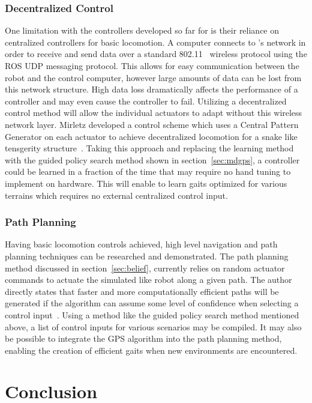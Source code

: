 \subsubsection{Decentralized Control}
One limitation with the controllers developed so far for \SB{} is their reliance on centralized controllers for basic locomotion.
A computer connects to \SB{}'s network in order to receive and send data over a standard 802.11~\cite{ieee1997wireless} wireless protocol using the ROS UDP messaging protocol.
This allows for easy communication between the robot and the control computer, however large amounts of data can be lost from this network structure.
High data loss dramatically affects the performance of a controller and may even cause the controller to fail.
Utilizing a decentralized control method will allow the individual actuators to adapt without this wireless network layer.
Mirletz \etal developed a control scheme which uses a Central Pattern Generator on each actuator to achieve decentralized locomotion for a snake like tensgerity structure~\cite{mirletz2015goal}.
Taking this approach and replacing the learning method with the guided policy search method shown in section~\ref{sec:mdgps}, a controller could be learned in a fraction of the time that may require no hand tuning to implement on hardware.
This will enable \SB{} to learn gaits optimized for various terrains which requires no external centralized control input.

\subsubsection{Path Planning}
Having basic locomotion controls achieved, high level navigation and path planning techniques can be researched and demonstrated.
The path planning method discussed in section~\ref{sec:belief}, currently relies on random actuator commands to actuate the simulated \SB{} like robot along a given path.
The author directly states that faster and more computationally efficient paths will be generated if the algorithm can assume some level of confidence when selecting a control input~\cite{littlefieldintegrating}.
Using a method like the guided policy search method mentioned above, a list of control inputs for various scenarios may be compiled.
It may also be possible to integrate the GPS algorithm into the path planning method, enabling the creation of efficient gaits when new environments are encountered.

\section{Conclusion}

